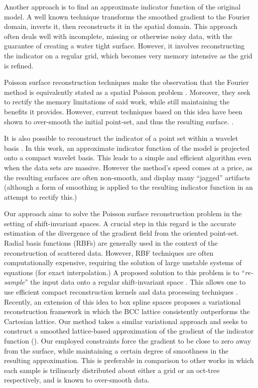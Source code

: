 Another approach is to find an approximate indicator function of the
original model. A well known technique \cite{fftk} transforms the
smoothed gradient to the Fourier domain, inverts it, then reconstructs
it in the spatial domain. This approach often deals well with
incomplete, missing or otherwise noisy data, with the guarantee of
creating a water tight surface. However, it involves reconstructing
the indicator on a regular grid, which becomes very memory intensive
as the grid is refined.

Poisson surface reconstruction techniques make the observation that
the Fourier method is equivalently stated as a spatial Poisson problem
\cite{Kazhdan06,screenedk}. Moreover, they seek to rectify the memory
limitations of said work, while still maintaining the benefits it
provides. However, current techniques based on this idea have been
shown to over-smooth the initial point-set, and thus the resulting
surface. \cite{reconbench}.

It is also possible to reconstruct the indicator of a point set within
a wavelet basis \cite{wavelet}. In this work, an approximate indicator
function of the model is projected onto a compact wavelet basis. This
leads to a simple and efficient algorithm even when the data sets
are massive. However the method's speed comes at a price, as the
resulting surfaces are often non-smooth, and display many ``jagged''
artifacts (although a form of smoothing is applied to the resulting
indicator function in an attempt to rectify this.)

Our approach aims to solve the Poisson surface reconstruction problem
in the setting of shift-invariant spaces. A crucial step in this
regard is the accurate estimation of the divergence of the gradient
field from the oriented point-set. Radial basis functions (RBFs) are
generally used in the context of the reconstruction of scattered data. 
However, RBF techniques are often computationally
expensive, requiring the solution of large unstable systems of
equations (for exact interpolation.) A proposed solution to this
problem is to ``\emph{re-sample}'' the input data onto a regular
shift-invariant space . This allows one to use efficient compact
reconstruction kernels and data processing techniques
\cite{variational,onvari}. Recently, an extension of this idea to box
spline spaces \cite{xu2012rec} proposes a variational reconstruction
framework in which the BCC lattice consistently outperforms the
Cartesian lattice. Our method takes a similar variational approach and
seeks to construct a smoothed lattice-based approximation of the
gradient of the indicator function (). Our employed
constraints force the gradient to be close to zero away from the
surface, while maintaining a certain degree of smoothness in the
resulting approximation. This is preferable in comparison to other
works \cite{fftk,Kazhdan06,screenedk} in which each sample is
trilinearly distributed about either a grid or an oct-tree
respectively, and is known to over-smooth data.

